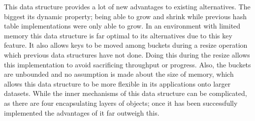 \documentclass[11pt]{article} %
\begin{document}
This data structure provides a lot of new advantages to existing alternatives. The biggest its dynamic property; being able to grow and shrink while previous hash table implementations were only able to grow. In an environment with limited memory this data structure is far optimal to its alternatives due to this key feature. It also allows keys to be moved among buckets during a resize operation which previous data structures have not done. Doing this during the resize allows this implementation to avoid sacrificing throughput or progress. Also, the buckets are unbounded and no assumption is made about the size of memory, which allows this data structure to be more flexible in its applications onto larger datasets. While the inner mechanisms of this data structure can be complicated, as there are four encapsulating layers of objects; once it has been successfully implemented the advantages of it far outweigh this.



\nocite{*}


\end{document}
